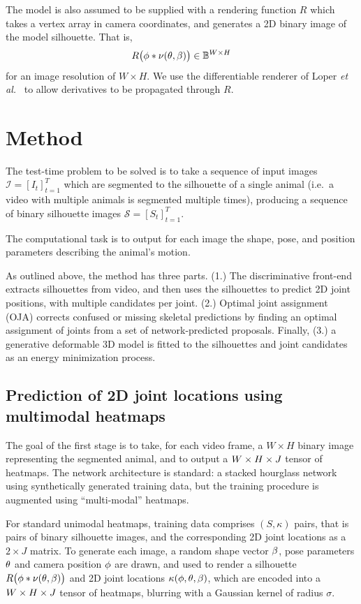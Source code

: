 The model is also assumed to be supplied with a rendering function $R$ which takes a vertex array in camera coordinates, and generates a 2D binary image of the model silhouette.  That is,
\begin{equation}
R\bigl(\phi * \nu(\theta, \beta)\bigr) \in \mathbb{B}^{W\times H}
\end{equation}
for an image resolution of $W \times H$.  We use the differentiable renderer of Loper {\em et al.}~\cite{loper2014opendr} to allow derivatives to be propagated through $R$.  
\newpage
\section{Method}
\def\seq#1#2#3#4{\left[{#1_{#2}}\right]_{#2=#3}^{#4}}
The test-time problem to be solved is to take a sequence of input images
$
\mathcal I = \seq I t1T
$
which are segmented to the silhouette of a single animal (i.e.~a video with multiple animals is segmented multiple times), producing a sequence of binary silhouette images 
$
\mathcal S = \seq S t1T.
$

The computational task is to output for each image the shape,  pose, and position parameters describing the animal's motion.

As outlined above, the method has three parts.  
(1.) The discriminative front-end extracts silhouettes from video, and then uses the silhouettes to predict 2D joint positions, with multiple candidates per joint. 
(2.) Optimal joint assignment (OJA) corrects confused or missing skeletal predictions by finding an optimal assignment of joints from a set of network-predicted proposals. Finally, (3.) a generative deformable 3D model is fitted to the silhouettes and joint candidates as an energy minimization process.

\subsection{Prediction of 2D joint locations using multimodal heatmaps}
The goal of the first stage is to take, for each video frame, a $W\times H$ binary image representing the segmented animal, and to output a $W \times H \times J$ tensor of heatmaps. The network architecture is standard: a stacked hourglass network~\cite{newell2016stacked} using synthetically generated training data, but the training procedure is augmented using ``multi-modal'' heatmaps. 

For standard unimodal heatmaps, training data comprises $(S, \kappa)$ pairs, that is pairs of binary silhouette images, and the corresponding 2D joint locations as a $2\times J$ matrix.  To generate each image, a random shape vector $\beta$, pose parameters $\theta$ and camera position $\phi$ are drawn, and used to render a silhouette $R\bigl(\phi * \nu(\theta, \beta)\bigr)$ and 2D joint locations $\kappa(\phi,\theta,\beta)$, which are encoded into a $W \times H \times J$ tensor of heatmaps, blurring with a Gaussian kernel of radius $\sigma$. 

